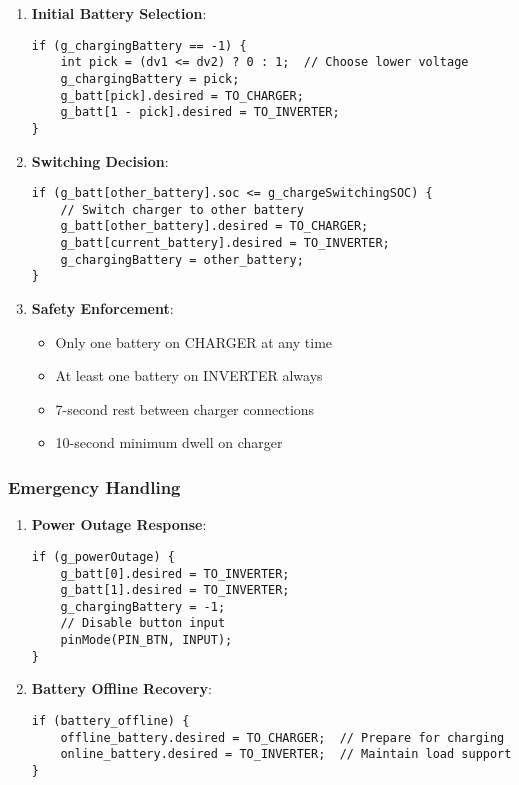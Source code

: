 \documentclass[11pt,a4paper]{article}
\begin{document}
\begin{enumerate}
    \item \textbf{Initial Battery Selection}:
    \begin{lstlisting}[caption=Initial Battery Selection]
if (g_chargingBattery == -1) {
    int pick = (dv1 <= dv2) ? 0 : 1;  // Choose lower voltage
    g_chargingBattery = pick;
    g_batt[pick].desired = TO_CHARGER;
    g_batt[1 - pick].desired = TO_INVERTER;
}
    \end{lstlisting}
    
    \item \textbf{Switching Decision}:
    \begin{lstlisting}[caption=Switching Decision Logic]
if (g_batt[other_battery].soc <= g_chargeSwitchingSOC) {
    // Switch charger to other battery
    g_batt[other_battery].desired = TO_CHARGER;
    g_batt[current_battery].desired = TO_INVERTER;
    g_chargingBattery = other_battery;
}
    \end{lstlisting}
    
    \item \textbf{Safety Enforcement}:
    \begin{itemize}
        \item Only one battery on CHARGER at any time
        \item At least one battery on INVERTER always
        \item 7-second rest between charger connections
        \item 10-second minimum dwell on charger
    \end{itemize}
\end{enumerate}

\subsubsection{Emergency Handling}

\begin{enumerate}
    \item \textbf{Power Outage Response}:
    \begin{lstlisting}[caption=Power Outage Response]
if (g_powerOutage) {
    g_batt[0].desired = TO_INVERTER;
    g_batt[1].desired = TO_INVERTER;
    g_chargingBattery = -1;
    // Disable button input
    pinMode(PIN_BTN, INPUT);
}
    \end{lstlisting}
    
    \item \textbf{Battery Offline Recovery}:
    \begin{lstlisting}[caption=Battery Offline Recovery]
if (battery_offline) {
    offline_battery.desired = TO_CHARGER;  // Prepare for charging
    online_battery.desired = TO_INVERTER;  // Maintain load support
}
    \end{lstlisting}
\end{enumerate}
\end{document}
